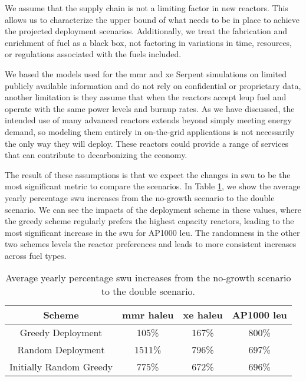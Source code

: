 We assume that the supply chain is not a limiting factor in new reactors. This allows us to characterize the upper bound of what needs to be in place to achieve the projected deployment scenarios. Additionally, we treat the fabrication and enrichment of fuel as a black box, not factoring in variations in time, resources, or regulations associated with the fuels included.

We based the models used for the \gls{mmr} and \gls{xe} Serpent simulations on limited publicly available information and do not rely on confidential or proprietary data, another limitation is they assume that when the reactors accept \gls{leup} fuel and operate with the same power levels and burnup rates. As we have discussed, the intended use of many advanced reactors extends beyond simply meeting energy demand, so modeling them entirely in on-the-grid applications is not necessarily the only way they will deploy. These reactors could provide a range of services that can contribute to decarbonizing the economy.

The result of these assumptions is that we expect the changes in \gls{swu} to be the most significant metric to compare the scenarios. In Table \ref{tab:swu_incs}, we show the average yearly percentage \gls{swu} increases from the no-growth scenario to the double scenario. We can see the impacts of the deployment scheme in these values, where the greedy scheme regularly prefers the highest capacity reactors, leading to the most significant increase in the \gls{swu} for AP1000 \gls{leu}. The randomness in the other two schemes levels the reactor preferences and leads to more consistent increases across fuel types.

\begin{table}[H]
    \centering
    \caption{Average yearly percentage \gls{swu} increases from the no-growth scenario to the double scenario.}
    \label{tab:swu_incs}
    \begin{tabular}{c c c c}
        \hline
        Scheme & \gls{mmr} \gls{haleu} & \gls{xe} \gls{haleu} & AP1000 \gls{leu}\\
        \hline
        Greedy Deployment & 105\% & 167\% & 800\% \\
        Random Deployment & 1511\% & 796\% & 697\% \\
        Initially Random Greedy & 775\% & 672\% & 696\% \\
        \hline
    \end{tabular}
\end{table}

